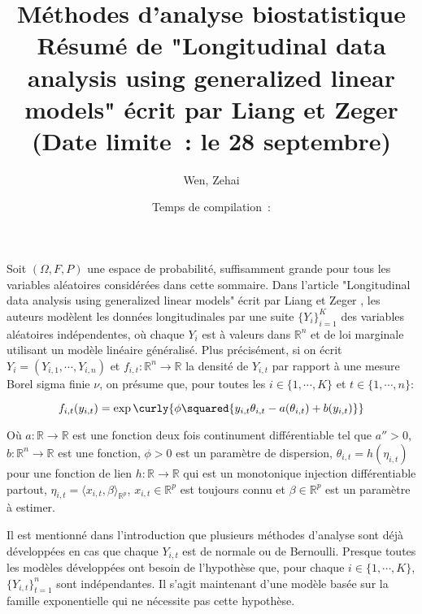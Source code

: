 \documentclass[../main.tex]{subfiles}
\title{Méthodes d'analyse biostatistique \\ 
Résumé de "Longitudinal data analysis using generalized linear models" écrit par Liang et Zeger \\ 
(Date limite : le 28 septembre)}
\author{Wen, Zehai }
\date{Temps de compilation : \DTMnow}
\begin{document}
\maketitle


Soit $(\Omega, F, P)$ une espace de probabilité, 
suffisamment grande pour tous les variables aléatoires considérées dans cette sommaire.
Dans l'article "Longitudinal data analysis using generalized linear models" écrit par Liang et Zeger \cite{liang_zeger},
les auteurs modèlent les données longitudinales par une suite $\{Y_i\}_{i=1}^K$ des variables aléatoires indépendentes,
où chaque $Y_i$ est à valeurs dans $\mathbb{R}^{n}$ et de loi marginale utilisant un modèle linéaire généralisé.
Plus précisément, si on écrit $Y_i = (Y_{i,1}, \cdots, Y_{i,n})$ et 
$f_{i,t} : \mathbb{R}^{n} \to \mathbb{R}$ la densité de $Y_{i,t}$ par rapport à une mesure Borel sigma finie $\nu$,
on présume que, pour toutes les $i \in \{1, \cdots, K\}$ et $t \in \{1, \cdots, n\}$:

\begin{equation*}
    f_{i,t}(y_{i,t}) = \exp \curly{\phi \squared{y_{i,t} \theta_{i,t} - a(\theta_{i,t}) + b(y_{i,t})}}
\end{equation*}

Où $a: \mathbb{R} \to \mathbb{R}$ est une fonction deux fois continument différentiable tel que $a'' > 0$,
$b: \mathbb{R}^{n} \to \mathbb{R}$ est une fonction, $\phi > 0$ est un paramètre de dispersion, 
$\theta_{i,t} = h(\eta_{i,t})$ pour une fonction de lien $h: \mathbb{R} \to \mathbb{R}$ qui est 
un monotonique injection différentiable partout, $\eta_{i,t} = \langle x_{i,t}, \beta \rangle_{\mathbb{R}^p}$,
$x_{i,t} \in \mathbb{R}^p$ est toujours connu et $\beta \in \mathbb{R}^p$ est un paramètre à estimer. 

Il est mentionné dans l'introduction que plusieurs méthodes d'analyse sont déjà développées en cas que 
chaque $Y_{i,t}$ est de normale ou de Bernoulli. Presque toutes les modèles développées ont besoin de
l'hypothèse que, pour chaque $i \in \{1, \cdots, K\}$, $\{Y_{i,t}\}_{t=1}^n$ sont indépendantes. 
Il s'agit maintenant d'une modèle basée sur la famille exponentielle qui ne nécessite pas cette hypothèse.
\end{document}
